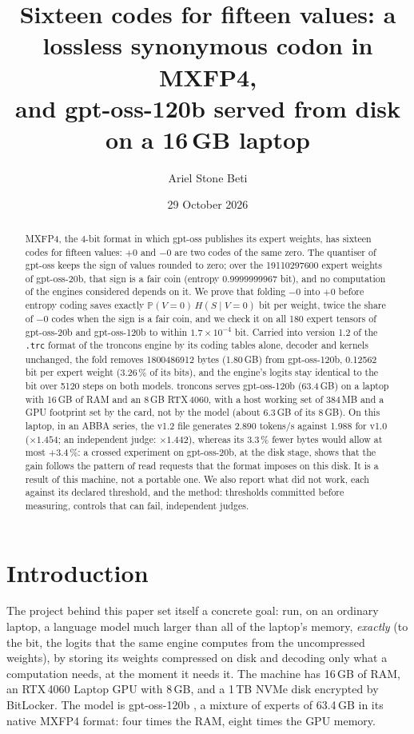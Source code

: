 \documentclass[11pt, a4paper]{article}
\title{Sixteen codes for fifteen values: a lossless synonymous codon in MXFP4,\texorpdfstring{\\}{ }
and gpt-oss-120b served from disk on a \texorpdfstring{16\,GB}{16 GB} laptop}
\author{Ariel Stone Beti}
\date{29 October 2026}
\theoremstyle{remark}
\newcommand{\Prob}{\mathbb{P}}
\begin{document}
\maketitle

\begin{abstract}
MXFP4, the 4-bit format in which gpt-oss publishes its expert weights, has sixteen codes for fifteen values: $+0$ and $-0$ are two codes of the same zero. The quantiser of gpt-oss keeps the sign of values rounded to zero; over the \num{19110297600} expert weights of gpt-oss-20b, that sign is a fair coin (entropy 0.9999999967 bit), and no computation of the engines considered depends on it. We prove that folding $-0$ into $+0$ before entropy coding saves exactly $\Prob(V = 0)\,H(S \mid V = 0)$ bit per weight, twice the share of $-0$ codes when the sign is a fair coin, and we check it on all 180 expert tensors of gpt-oss-20b and gpt-oss-120b to within $1.7 \times 10^{-4}$ bit. Carried into version 1.2 of the \texttt{.trc} format of the troncons engine by its coding tables alone, decoder and kernels unchanged, the fold removes \num{1800486912} bytes (1.80\,GB) from gpt-oss-120b, 0.12562 bit per expert weight (3.26\,\% of its bits), and the engine's logits stay identical to the bit over \num{5120} steps on both models. troncons serves gpt-oss-120b (63.4\,GB) on a laptop with 16\,GB of RAM and an 8\,GB RTX\,4060, with a host working set of 384\,MB and a GPU footprint set by the card, not by the model (about 6.3\,GB of its 8\,GB). On this laptop, in an ABBA series, the v1.2 file generates 2.890 tokens/s against 1.988 for v1.0 ($\times 1.454$; an independent judge: $\times 1.442$), whereas its 3.3\,\% fewer bytes would allow at most $+3.4\,\%$: a crossed experiment on gpt-oss-20b, at the disk stage, shows that the gain follows the pattern of read requests that the format imposes on this disk. It is a result of this machine, not a portable one. We also report what did not work, each against its declared threshold, and the method: thresholds committed before measuring, controls that can fail, independent judges.
\end{abstract}

\section{Introduction}\label{sec:intro}

The project behind this paper set itself a concrete goal: run, on an ordinary laptop, a language model much larger than all of the laptop's memory, \emph{exactly} (to the bit, the logits that the same engine computes from the uncompressed weights), by storing its weights compressed on disk and decoding only what a computation needs, at the moment it needs it. The machine has 16\,GB of RAM, an RTX\,4060 Laptop GPU with 8\,GB, and a 1\,TB NVMe disk encrypted by BitLocker. The model is gpt-oss-120b \citep{openai2025gptoss}, a mixture of experts of 63.4\,GB in its native MXFP4 format: four times the RAM, eight times the GPU memory.
\end{document}
